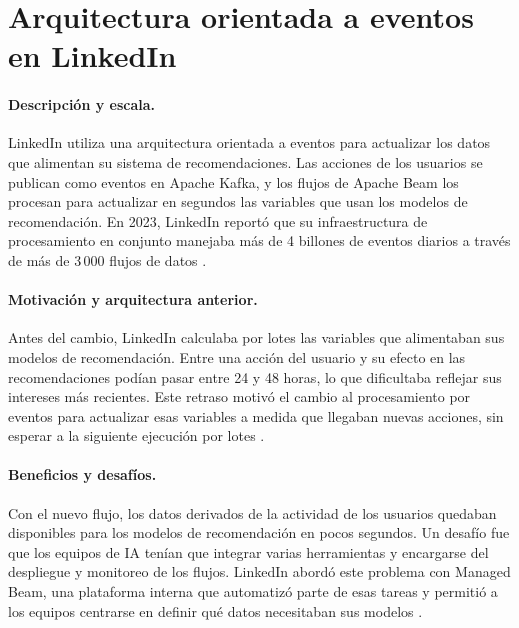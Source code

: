 \section{Arquitectura orientada a eventos en LinkedIn}

\paragraph{Descripción y escala.}
LinkedIn utiliza una arquitectura orientada a eventos para actualizar los datos
que alimentan su sistema de recomendaciones. Las acciones de los usuarios
se publican como eventos en Apache Kafka, y los flujos de Apache Beam los
procesan para actualizar en segundos las variables que usan los modelos de
recomendación. En 2023, LinkedIn reportó que su infraestructura de procesamiento
en conjunto manejaba más de 4 billones de eventos diarios a través de más de
3\,000 flujos de datos \cite{xia2023linkedin}.

\paragraph{Motivación y arquitectura anterior.}
Antes del cambio, LinkedIn calculaba por lotes las variables que alimentaban
sus modelos de recomendación. Entre una acción del usuario y su efecto en
las recomendaciones podían pasar entre 24 y 48 horas, lo que dificultaba
reflejar sus intereses más recientes. Este retraso motivó el cambio al
procesamiento por eventos para actualizar esas variables a medida que llegaban nuevas acciones,
sin esperar a la siguiente ejecución por lotes \cite{xia2023linkedin}.

\paragraph{Beneficios y desafíos.}
Con el nuevo flujo, los datos derivados de la actividad de los usuarios
quedaban disponibles para los modelos de recomendación en pocos segundos.
Un desafío fue que los equipos de IA tenían que integrar varias herramientas
y encargarse del despliegue y monitoreo de los flujos. LinkedIn abordó este
problema con Managed Beam, una plataforma interna que automatizó parte de
esas tareas y permitió a los equipos centrarse en definir qué datos necesitaban
sus modelos \cite{xia2023linkedin}.

